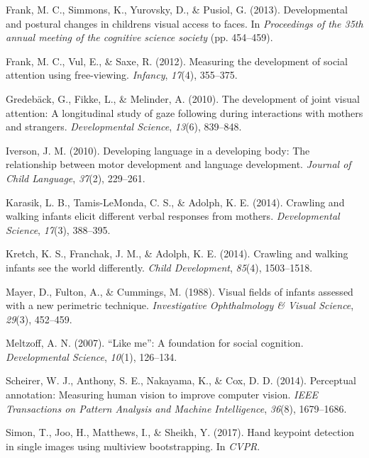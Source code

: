 \documentclass[10pt, letterpaper]{article}
\begin{document}
\hypertarget{ref-frank2013}{}
Frank, M. C., Simmons, K., Yurovsky, D., \& Pusiol, G. (2013).
Developmental and postural changes in childrens visual access to faces.
In \emph{Proceedings of the 35th annual meeting of the cognitive science
society} (pp. 454--459).

\hypertarget{ref-frank2012measuring}{}
Frank, M. C., Vul, E., \& Saxe, R. (2012). Measuring the development of
social attention using free-viewing. \emph{Infancy}, \emph{17}(4),
355--375.

\hypertarget{ref-gredeback2010development}{}
Gredebäck, G., Fikke, L., \& Melinder, A. (2010). The development of
joint visual attention: A longitudinal study of gaze following during
interactions with mothers and strangers. \emph{Developmental Science},
\emph{13}(6), 839--848.

\hypertarget{ref-iverson2010}{}
Iverson, J. M. (2010). Developing language in a developing body: The
relationship between motor development and language development.
\emph{Journal of Child Language}, \emph{37}(2), 229--261.

\hypertarget{ref-karasik2014}{}
Karasik, L. B., Tamis-LeMonda, C. S., \& Adolph, K. E. (2014). Crawling
and walking infants elicit different verbal responses from mothers.
\emph{Developmental Science}, \emph{17}(3), 388--395.

\hypertarget{ref-kretch2014}{}
Kretch, K. S., Franchak, J. M., \& Adolph, K. E. (2014). Crawling and
walking infants see the world differently. \emph{Child Development},
\emph{85}(4), 1503--1518.

\hypertarget{ref-mayer1988}{}
Mayer, D., Fulton, A., \& Cummings, M. (1988). Visual fields of infants
assessed with a new perimetric technique. \emph{Investigative
Ophthalmology \& Visual Science}, \emph{29}(3), 452--459.

\hypertarget{ref-meltzoff2007like}{}
Meltzoff, A. N. (2007). ``Like me'': A foundation for social cognition.
\emph{Developmental Science}, \emph{10}(1), 126--134.

\hypertarget{ref-scheirer2014perceptual}{}
Scheirer, W. J., Anthony, S. E., Nakayama, K., \& Cox, D. D. (2014).
Perceptual annotation: Measuring human vision to improve computer
vision. \emph{IEEE Transactions on Pattern Analysis and Machine
Intelligence}, \emph{36}(8), 1679--1686.

\hypertarget{ref-simon2017hand}{}
Simon, T., Joo, H., Matthews, I., \& Sheikh, Y. (2017). Hand keypoint
detection in single images using multiview bootstrapping. In
\emph{CVPR}.
\end{document}
